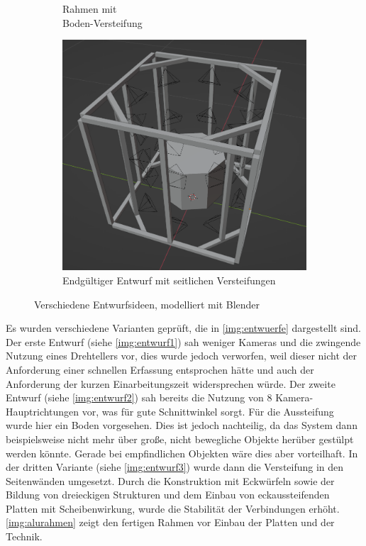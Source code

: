 \documentclass[./00PhotoBox.tex]{subfiles}
\begin{document}
\begin{figure}[htbp]
\begin{subfigure}{0.30\textwidth}
        \centering
        \caption{Rahmen mit\\Boden-Versteifung}
        \label{img:entwurf2}
    \end{subfigure}
    \begin{subfigure}{0.30\textwidth}
        \includegraphics[height=1\linewidth]{./img/3_aufbau/modell3.png}
        \centering
        \caption{Endgültiger Entwurf mit seitlichen Versteifungen}
        \label{img:entwurf3}
    \end{subfigure}
    \caption{Verschiedene Entwurfsideen, modelliert mit Blender}
    \label{img:entwuerfe}
\end{figure}

Es wurden verschiedene Varianten geprüft, die in \autoref{img:entwuerfe} dargestellt sind. Der erste Entwurf (siehe \autoref{img:entwurf1}) sah weniger Kameras und die zwingende Nutzung eines Drehtellers vor, dies wurde jedoch verworfen, weil dieser nicht der Anforderung einer schnellen Erfassung entsprochen hätte und auch der Anforderung der kurzen Einarbeitungszeit widersprechen würde. Der zweite Entwurf (siehe \autoref{img:entwurf2}) sah bereits die Nutzung von 8 Kamera-Hauptrichtungen vor, was für gute Schnittwinkel sorgt. Für die Aussteifung wurde hier ein Boden vorgesehen. Dies ist jedoch nachteilig, da das System dann beispielsweise nicht mehr über große, nicht bewegliche Objekte herüber gestülpt werden könnte. Gerade bei empfindlichen Objekten wäre dies aber vorteilhaft. In der dritten Variante (siehe \autoref{img:entwurf3}) wurde dann die Versteifung in den Seitenwänden umgesetzt. Durch die Konstruktion mit Eckwürfeln sowie der Bildung von dreieckigen Strukturen und dem Einbau von eckaussteifenden Platten mit Scheibenwirkung, wurde die Stabilität der Verbindungen erhöht. \autoref{img:alurahmen} zeigt den fertigen Rahmen vor Einbau der Platten und der Technik.
\end{document}
